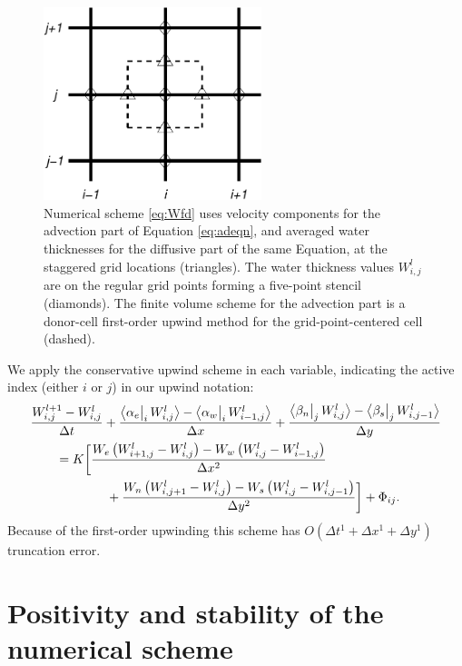 \documentclass[12pt,final]{amsart}%
\newcommand{\Wlij}{W^l_{i,j}}
\newcommand{\upp}[3]{\big<#1\big|_{#3}\,#2\big>}
\begin{document}
\begin{figure}[ht]
\centering
\includegraphics[width=2.5in,keepaspectratio=true]{figs/diffstencil}
\bigskip
\caption{Numerical scheme \eqref{eq:Wfd} uses velocity components for the advection part of Equation \eqref{eq:adeqn}, and averaged water thicknesses for the diffusive part of the same Equation, at the staggered grid locations (triangles).  The water thickness values $W_{i,j}^l$ are on the regular grid points forming a five-point stencil (diamonds).  The finite volume scheme for the advection part is a donor-cell first-order upwind method for the grid-point-centered cell (dashed).}
\label{fig:stencil}
\end{figure}

We apply the conservative upwind scheme in each variable, indicating the active index (either $i$ or $j$) in our upwind notation:
\begin{align}
 &\frac{W_{i,j}^{l+1} - \Wlij}{\Delta t} + \frac{\upp{\alpha_e}{\Wlij}{i} - \upp{\alpha_w}{W_{i-1,j}^l}{i}}{\Delta x} + \frac{\upp{\beta_n}{\Wlij}{j} - \upp{\beta_s}{W_{i,j-1}^l}{j}}{\Delta y}  \label{eq:Wfd} \\
      &\qquad = K \bigg[\frac{W_e \left(W_{i+1,j}^l - \Wlij\right) - W_w \left(\Wlij - W_{i-1,j}^l\right)}{\Delta x^2}  \notag \\
      &\qquad\qquad\qquad + \frac{W_n \left(W_{i,j+1}^l - \Wlij\right) - W_s \left(\Wlij - W_{i,j-1}^l\right)}{\Delta y^2}\bigg] + \Phi_{ij}. \notag
\end{align}
Because of the first-order upwinding this scheme has $O(\Delta t^1 + \Delta x^1 + \Delta y^1)$ truncation error.




\small


\appendix

\section{Positivity and stability of the numerical scheme}
\end{document}
